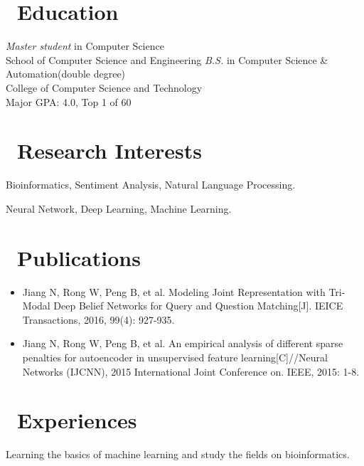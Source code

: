 \documentclass{resume}
\begin{document}



\section{\faGraduationCap\ Education}
\textit{Master student} in Computer Science \\
School of Computer Science and Engineering
\textit{B.S.} in Computer Science \& Automation(double degree)\\
College of Computer Science and Technology\\
Major GPA: 4.0, Top 1 of 60

\section{\faLightbulbO\ Research Interests}
Bioinformatics, Sentiment Analysis, Natural Language Processing.

Neural Network, Deep Learning, Machine Learning.

\section{\faBook\ Publications}
\begin{itemize}[parsep=0.5ex]
\item Jiang N, Rong W, Peng B, et al. Modeling Joint Representation with Tri-Modal Deep Belief Networks for Query and Question Matching[J]. IEICE Transactions, 2016, 99(4): 927-935.

\item Jiang N, Rong W, Peng B, et al. An empirical analysis of different sparse penalties for autoencoder in unsupervised feature learning[C]//Neural Networks (IJCNN), 2015 International Joint Conference on. IEEE, 2015: 1-8.
\end{itemize}
\section{\faUsers\ Experiences}
Learning the basics of machine learning and study the fields on bioinformatics.
\end{document}
